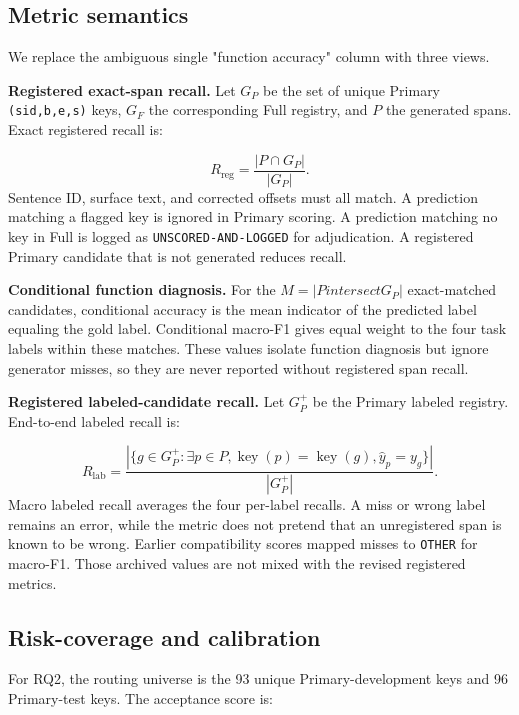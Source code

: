 \documentclass{CUP-JNL-NLP}
\begin{document}
\subsection{Metric semantics}
We replace the ambiguous single "function accuracy" column with three views.

\textbf{Registered exact-span recall.} Let $G_P$ be the set of unique Primary \texttt{(sid,b,e,s)} keys, $G_F$ the corresponding Full registry, and $P$ the generated spans. Exact registered recall is:

\begin{equation}
R_{\mathrm{reg}}=\frac{|P\cap G_P|}{|G_P|}.
\end{equation}
Sentence ID, surface text, and corrected offsets must all match. A prediction matching a flagged key is ignored in Primary scoring. A prediction matching no key in Full is logged as \texttt{UNSCORED-AND-LOGGED} for adjudication. A registered Primary candidate that is not generated reduces recall.

\textbf{Conditional function diagnosis.} For the $M=|P intersect G_P|$ exact-matched candidates, conditional accuracy is the mean indicator of the predicted label equaling the gold label. Conditional macro-F1 gives equal weight to the four task labels within these matches. These values isolate function diagnosis but ignore generator misses, so they are never reported without registered span recall.

\textbf{Registered labeled-candidate recall.} Let $G_P^+$ be the Primary labeled registry. End-to-end labeled recall is:

\begin{equation}
R_{\mathrm{lab}}=\frac{|\{g\in G_P^+:\exists p\in P,\operatorname{key}(p)=\operatorname{key}(g),\widehat y_p=y_g\}|}{|G_P^+|}.
\end{equation}
Macro labeled recall averages the four per-label recalls. A miss or wrong label remains an error, while the metric does not pretend that an unregistered span is known to be wrong. Earlier compatibility scores mapped misses to \texttt{OTHER} for macro-F1. Those archived values are not mixed with the revised registered metrics.

\subsection{Risk-coverage and calibration}
For RQ2, the routing universe is the 93 unique Primary-development keys and 96 Primary-test keys. The acceptance score is:
\end{document}
